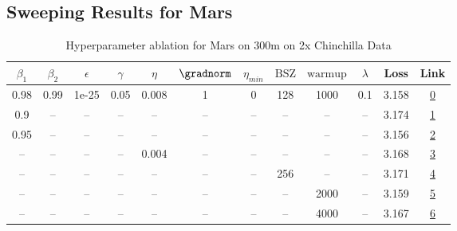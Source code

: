 \subsection{Sweeping Results for Mars}%
\begin{table}[H]
\centering
\caption{Hyperparameter ablation for Mars on 300m on 2x Chinchilla Data}
\label{tab:ablation_mars_300m_on_2x_chinchilla_data}
\begin{tabular}{cccccccccccc}
\toprule
$\beta_1$ & $\beta_2$ & $\epsilon$ & $\gamma$ & $\eta$ & $\gradnorm$ & $\eta_{min}$ & $\mathrm{BSZ}$ & $\mathrm{warmup}$ & $\lambda$ & Loss & Link \\
\midrule
0.98 & 0.99 & 1e-25 & 0.05 & 0.008 & 1 & 0 & 128 & 1000 & 0.1 & 3.158 & \href{https://wandb.ai/stanford-mercury/optimizer-scaling/runs/sweep-300m-12B-marskbb066blr0.008-wd0.1-minlr0-warmup1000-b10.98-f75ea4}{0} \\
\midrule
0.9 & -- & -- & -- & -- & -- & -- & -- & -- & -- & 3.174 & \href{https://wandb.ai/stanford-mercury/optimizer-scaling/runs/sweep-300m-12B-marsk83eefflr0.008-wd0.1-minlr0-warmup1000-b10.9--e2df5c}{1} \\
0.95 & -- & -- & -- & -- & -- & -- & -- & -- & -- & 3.156 & \href{https://wandb.ai/stanford-mercury/optimizer-scaling/runs/sweep-300m-12B-marskb945b4lr0.008-wd0.1-minlr0-warmup1000-b10.95-2538fa}{2} \\
-- & -- & -- & -- & 0.004 & -- & -- & -- & -- & -- & 3.168 & \href{https://wandb.ai/stanford-mercury/optimizer-scaling/runs/sweep-300m-12B-marsfd64d98lr0.004-wd0.1-minlr0-warmup1000-b10.98-e0cf98}{3} \\
-- & -- & -- & -- & -- & -- & -- & 256 & -- & -- & 3.171 & \href{https://wandb.ai/stanford-mercury/optimizer-scaling/runs/sweep-300m-12B-marsk65640blr0.008-wd0.1-minlr0-warmup1000-b10.98-745d48}{4} \\
-- & -- & -- & -- & -- & -- & -- & -- & 2000 & -- & 3.159 & \href{https://wandb.ai/stanford-mercury/optimizer-scaling/runs/sweep-300m-12B-marskf7adbelr0.008-wd0.1-minlr0-warmup2000-b10.98-b861e3}{5} \\
-- & -- & -- & -- & -- & -- & -- & -- & 4000 & -- & 3.167 & \href{https://wandb.ai/stanford-mercury/optimizer-scaling/runs/sweep-300m-12B-marskcd8133lr0.008-wd0.1-minlr0-warmup4000-b10.98-8a3bc4}{6} \\
\bottomrule
\end{tabular}
\end{table}

